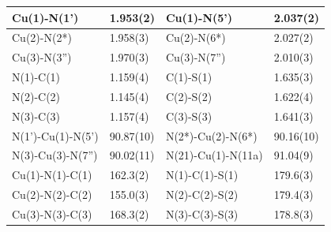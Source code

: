 \renewcommand{\arraystretch}{1.5}
\begin{table}[htpb!]
\centering
{}
\begin{tabular}{|l|l|l|l|}
\hline
Cu(1)-N(1') & 1.953(2) & Cu(1)-N(5') & 2.037(2)\\
\hline
Cu(2)-N(2*) & 1.958(3) & Cu(2)-N(6*) & 2.027(2)\\
\hline
Cu(3)-N(3'') & 1.970(3) & Cu(3)-N(7'') & 2.010(3)\\
\hline
N(1)-C(1) & 1.159(4) & C(1)-S(1) & 1.635(3)\\
\hline
N(2)-C(2) & 1.145(4) & C(2)-S(2) & 1.622(4)\\
\hline
N(3)-C(3) & 1.157(4) & C(3)-S(3) & 1.641(3)\\
\hline
\hline
N(1')-Cu(1)-N(5') & 90.87(10) & N(2*)-Cu(2)-N(6*) & 90.16(10)\\
\hline
N(3)-Cu(3)-N(7'') & 90.02(11) & N(21)-Cu(1)-N(11a) & 91.04(9)\\
\hline
Cu(1)-N(1)-C(1) & 162.3(2) & N(1)-C(1)-S(1) & 179.6(3)\\
\hline
Cu(2)-N(2)-C(2) & 155.0(3) &N(2)-C(2)-S(2) & 179.4(3)\\
\hline
Cu(3)-N(3)-C(3) & 168.3(2) & N(3)-C(3)-S(3) & 178.8(3)\\
\hline
\end{tabular}
\label{batlb:CoR4MOP}
\end{table}



